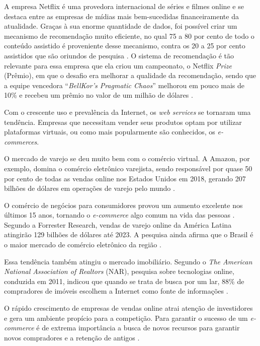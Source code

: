 A empresa Netflix é uma provedora internacional de séries e filmes online e se destaca entre as empresas de mídias mais bem-sucedidas financeiramente da atualidade. Graças à sua enorme quantidade de dados, foi possível criar um mecanismo de recomendação muito eficiente, no qual 75 a 80 por cento de todo o conteúdo assistido é proveniente desse mecanismo, contra os 20 a 25 por cento assistidos que são oriundos de pesquisa \cite{Kleinman:2014}. O sistema de recomendação é tão relevante para essa empresa que ela criou um campeonato, o Netflix \textit{Prize} (Prêmio), em que o desafio era melhorar a qualidade da recomendação, sendo que a equipe vencedora “\textit{BellKor's Pragmatic Chaos}” melhorou em pouco mais de 10\% e recebeu um prêmio no valor de um milhão de dólares \cite{netflixprize:2009}.

Com o crescente uso e prevalência da Internet, os \textit{web services} se tornaram uma tendência. Empresas que necessitam vender seus produtos optam por utilizar plataformas virtuais, ou como mais popularmente são conhecidos, os \textit{e-commerces}.

O mercado de varejo se deu muito bem com o comércio virtual. A Amazon, por exemplo, domina o comércio eletrônico varejista, sendo responsável por quase 50 por cento de todas as vendas online nos Estados Unidos em 2018, gerando 207 bilhões de dólares em operações de varejo pelo mundo \cite{JAKE:2019}.

O comércio de negócios para consumidores provou um aumento excelente nos últimos 15 anos, tornando o \textit{e-commerce} algo comum na vida das pessoas \cite{Jiang:2015}. Segundo a Forrester Research, vendas de varejo online da América Latina atingirão 129 bilhões de dólares até 2023. A pesquisa ainda afirma que o Brasil é o maior mercado de comércio eletrônico da região \cite{Forrester:2019}.

Essa tendência também atingiu o mercado imobiliário. Segundo o \textit{The American National Association of Realtors} (NAR), pesquisa sobre tecnologias online, conduzida em 2011, indicou que quando se trata de busca por um lar, 88\% de compradores de imóveis escolhem a Internet como fonte de informações \cite{Yuan:2013}.

O rápido crescimento de empresas de vendas online atrai atenção de investidores e gera um ambiente propício para a competição. Para garantir o sucesso de um \textit{e-commerce} é de extrema importância a busca de novos recursos para garantir novos compradores e a retenção de antigos \cite{Jiang:2015}. 

